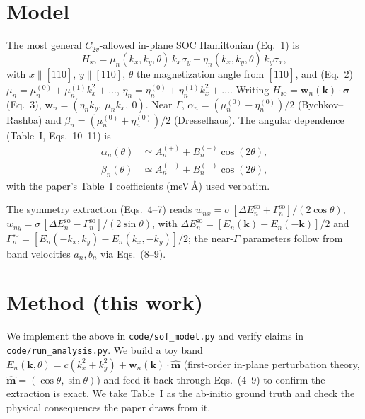 \documentclass[aps,prl,twocolumn,superscriptaddress]{revtex4-2}
\begin{document}
\section{Model}
The most general $C_{2v}$-allowed in-plane SOC Hamiltonian (Eq.~1) is
\begin{equation}
H_{\mathrm{so}}=\mu_n(k_x,k_y,\theta)\,k_x\sigma_y
+\eta_n(k_x,k_y,\theta)\,k_y\sigma_x,
\end{equation}
with $x\parallel[1\bar10]$, $y\parallel[110]$, $\theta$ the magnetization angle
from $[1\bar10]$, and (Eq.~2) $\mu_n=\mu_n^{(0)}+\mu_n^{(1)}k_x^2+\dots$,
$\eta_n=\eta_n^{(0)}+\eta_n^{(1)}k_x^2+\dots$. Writing $H_{\mathrm{so}}=
\mathbf{w}_n(\mathbf{k})\cdot\boldsymbol{\sigma}$ (Eq.~3),
$\mathbf{w}_n=(\eta_n k_y,\ \mu_n k_x,\ 0)$. Near $\Gamma$,
$\alpha_n=(\mu_n^{(0)}-\eta_n^{(0)})/2$ (Bychkov--Rashba) and
$\beta_n=(\mu_n^{(0)}+\eta_n^{(0)})/2$ (Dresselhaus). The angular dependence
(Table~I, Eqs.~10--11) is
\begin{align}
\alpha_n(\theta)&\simeq A_n^{(+)}+B_n^{(+)}\cos(2\theta),\\
\beta_n(\theta)&\simeq A_n^{(-)}+B_n^{(-)}\cos(2\theta),
\end{align}
with the paper's Table~I coefficients (meV\,\AA) used verbatim.

The symmetry extraction (Eqs.~4--7) reads
$w_{nx}=\sigma\,[\Delta E_n^{\mathrm{so}}+\Gamma_n^{\mathrm{so}}]/(2\cos\theta)$,
$w_{ny}=\sigma\,[\Delta E_n^{\mathrm{so}}-\Gamma_n^{\mathrm{so}}]/(2\sin\theta)$,
with $\Delta E_n^{\mathrm{so}}=[E_n(\mathbf{k})-E_n(-\mathbf{k})]/2$ and
$\Gamma_n^{\mathrm{so}}=[E_n(-k_x,k_y)-E_n(k_x,-k_y)]/2$; the near-$\Gamma$
parameters follow from band velocities $a_n,b_n$ via Eqs.~(8--9).

\section{Method (this work)}
We implement the above in \texttt{code/sof\_model.py} and verify claims in
\texttt{code/run\_analysis.py}. We build a toy band
$E_n(\mathbf{k},\theta)=c(k_x^2+k_y^2)+\mathbf{w}_n(\mathbf{k})\cdot\hat{\mathbf m}$
(first-order in-plane perturbation theory, $\hat{\mathbf m}=(\cos\theta,
\sin\theta)$) and feed it back through Eqs.~(4--9) to confirm the extraction is
exact. We take Table~I as the ab-initio ground truth and check the physical
consequences the paper draws from it.
\end{document}
